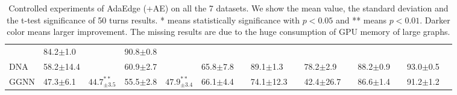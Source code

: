 \documentclass[letterpaper]{article} \usepackage{aaai20}  \usepackage{times}  \usepackage{helvet} \usepackage{courier}  \usepackage[hyphens]{url}  \usepackage{graphicx} \urlstyle{rm} \def\UrlFont{\rm}  \frenchspacing  \setlength{\pdfpagewidth}{8.5in}  \setlength{\pdfpageheight}{11in}  \setcounter{secnumdepth}{0}
\begin{document}
\begin{table*}[t]
{\begin{tabular}{l|ll|ll|ll|ll|ll|ll|ll}
& 84.2\tiny$\pm$1.0        &\cellcolor{deep_red}{$85.6^{**}_{\pm0.7}$}       
& 90.8\tiny$\pm$0.8         & \cellcolor{shallow_red}{$90.9_{\pm0.6}$}
          \\ 
DNA        
& 58.2\tiny$\pm$14.4       & \cellcolor{deep_red}{$60.1^{*}_{\pm10.8}$}          
& 60.9\tiny$\pm$2.7        & \cellcolor{shallow_red}{$61.3^{**}_{\pm2.2}$} 
& 65.8\tiny$\pm$7.8        & \cellcolor{deep_red}{$66.8^{*}_{\pm9.6}$} 
& 89.1\tiny$\pm$1.3        & \cellcolor{middle_red}{$89.8^{**}_{\pm0.6}$}       
& 78.2\tiny$\pm$2.9        & \cellcolor{deep_red}{$79.8^{**}_{\pm2.0}$}        
& 88.2\tiny$\pm$0.9        & \cellcolor{deep_red}{$90.0^{**}_{\pm0.6}$}       
& 93.0\tiny$\pm$0.5         & \cellcolor{shallow_red}{$93.3^{*}_{\pm0.4}$}       
         \\ 
GGNN       
& 47.3\tiny$\pm$6.1        & {$44.7^{**}_{\pm3.5}$}        
& 55.5\tiny$\pm$2.8        & {$47.9^{**}_{\pm3.4}$} 
& 66.1\tiny$\pm$4.4        & \cellcolor{deep_red}{$69.5^{**}_{\pm1.2}$}   
& 74.1\tiny$\pm$12.3       & \cellcolor{deep_red}{$80.6^{**}_{\pm7.2}$}        
& 42.4\tiny$\pm$26.7       & \cellcolor{deep_red}{$61.5^{**}_{\pm20.8}$}      
& 86.6\tiny$\pm$1.4        & \cellcolor{deep_red}{$88.2^{**}_{\pm0.8}$}     
& 91.2\tiny$\pm$1.2         & \cellcolor{shallow_red}{$91.6^{**}_{\pm0.7}$}      
     \\ \hline
\end{tabular}}
\caption{Controlled experiments of AdaEdge (+AE) on all the 7 datasets. We show the mean value, the standard deviation and the t-test significance of 50 turns results. 
* means statistically significance with $p<0.05$ and ** means $p<0.01$. Darker color means larger improvement. The missing results are due to the huge consumption of GPU memory of large graphs.}
\label{table_loop_result1}
\end{table*}
\end{document}
